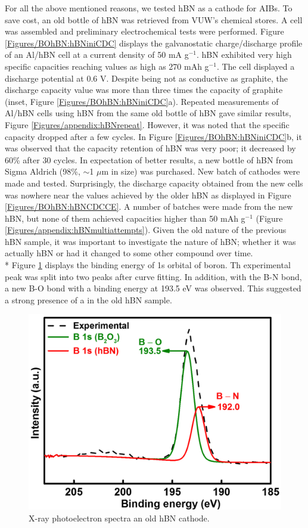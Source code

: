For all the above mentioned reasons, we tested hBN as a cathode for AIBs. To save cost, an old bottle of hBN was retrieved from VUW's chemical stores. A cell was assembled and preliminary electrochemical tests were performed. Figure \ref{Figures/BOhBN:hBNiniCDC} displays the galvanostatic charge/discharge profile of an Al/hBN cell at a current density of 50 mA g$^{-1}$. hBN exhibited very high specific capacities reaching values as high as 270 mAh g$^{-1}$. The cell displayed a discharge potential at 0.6 V. Despite being not as conductive as graphite, the discharge capacity value was more than three times the capacity of graphite (inset, Figure \ref{Figures/BOhBN:hBNiniCDC}a). Repeated measurements of Al/hBN cells using hBN from the same old bottle of hBN gave similar results, Figure \ref{Figures/appendix:hBNrepeat}. However, it was noted that the specific capacity dropped after a few cycles. In Figure \ref{Figures/BOhBN:hBNiniCDC}b, it was observed that the capacity retention of hBN was very poor; it decreased by 60\% after 30 cycles. In expectation of better results, a new bottle of hBN from Sigma Aldrich (98\%, $\sim$1 $\mu$m in size) was purchased. New batch of cathodes were made and tested. Surprisingly, the discharge capacity obtained from the new cells was nowhere near the values achieved by the older hBN as displayed in Figure \ref{Figures/BOhBN:hBNCDCCE}. A number of batches were made from the new hBN, but none of them achieved capacities higher than 50 mAh g$^{-1}$ (Figure \ref{Figures/appendix:hBNmultiattempts}). Given the old nature of the previous hBN sample, it was important to investigate the nature of hBN; whether it was actually hBN or had it changed to some other compound over time.\\*
Figure \ref{Figures/BOhBN:oldxps} displays the binding energy of 1s orbital of boron. Th experimental peak was split into two peaks after curve fitting. In addition, with the B-N bond, a new B-O bond with a binding energy at 193.5 eV was observed. This suggested a strong presence of a  in the old hBN sample.

\begin{figure}[tbh!]
\centering
\includegraphics[width=\textwidth]{Figures/BOhBN/oldxps}
\caption{X-ray photoelectron spectra an old hBN cathode.}
\label{Figures/BOhBN:oldxps}
\end{figure}

